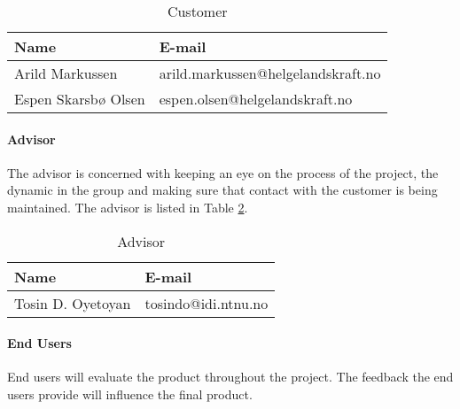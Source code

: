 \begin{table}[H]

\begin{center}
    \begin{tabular}{| l | l |}
   	\hline
    \rowcolor{gray}
    {\bf Name} & {\bf E-mail} \\ \hline
    Arild Markussen & arild.markussen@helgelandskraft.no \\ \hline
    Espen Skarsbø Olsen & espen.olsen@helgelandskraft.no \\
    \hline
    \end{tabular}
\end{center}

\caption{Customer}
\label{table:customer}
\end{table}

\paragraph{Advisor}

The advisor is concerned with keeping an eye on the process of the project, the dynamic in the group and making sure that contact with the customer is being maintained. The advisor is listed in Table \ref{table:advisor}.

\begin{table}[H]

\begin{center}
    \begin{tabular}{| l | l |}
    \hline
    \rowcolor{gray}
    {\bf Name} & {\bf E-mail} \\ \hline
    Tosin D. Oyetoyan & tosindo@idi.ntnu.no \\
    \hline
    \end{tabular}
\end{center}

\caption{Advisor}
\label{table:advisor}
\end{table}

\paragraph{End Users}

End users will evaluate the product throughout the project. The feedback the end users provide will influence the final product.


